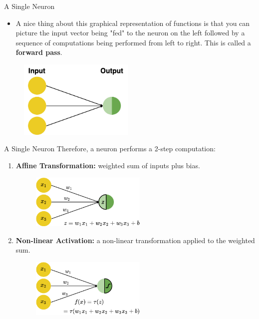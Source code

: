 \begin{vbframe} {A Single Neuron}
\begin{itemize}
\item A nice thing about this graphical representation of functions is that you can picture the input vector being "fed" to the neuron on the left followed by a sequence of computations being performed from left to right. This is called a \textbf{forward pass}.
\end{itemize}
\vspace{1cm}
\begin{figure}
\includegraphics[width=5.5cm]{figure/forward_pass.png}
\end{figure}
\end{vbframe}

\begin{frame} {A Single Neuron}
Therefore, a neuron performs a 2-step computation:
\begin{enumerate}
\item \textbf{Affine Transformation:} weighted sum of inputs plus bias.
\begin{figure}
\includegraphics[width=5.5cm]{figure/step1.png}
\end{figure}
\item \textbf{Non-linear Activation:} a non-linear transformation applied to the weighted sum.
\begin{figure}
\includegraphics[width=5.5cm]{figure/step2.png}
\end{figure}
\end{enumerate}
\end{frame}

